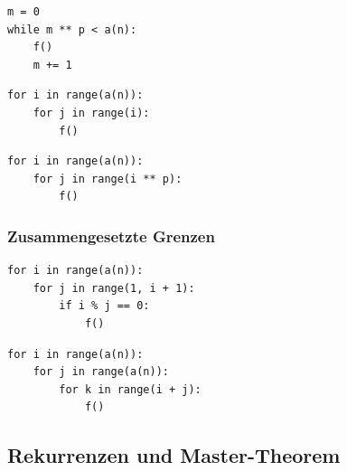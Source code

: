 \begin{loopcatalog}
\begin{lstlisting}[style=CodeExpert]
m = 0
while m ** p < a(n):
    f()
    m += 1
\end{lstlisting}

\begin{lstlisting}[style=CodeExpert]
for i in range(a(n)):
    for j in range(i):
        f()
\end{lstlisting}

\begin{lstlisting}[style=CodeExpert]
for i in range(a(n)):
    for j in range(i ** p):
        f()
\end{lstlisting}
\end{loopcatalog}

\subsubsection{Zusammengesetzte Grenzen}

\begin{loopcatalog}
\begin{lstlisting}[style=CodeExpert]
for i in range(a(n)):
    for j in range(1, i + 1):
        if i % j == 0:
            f()
\end{lstlisting}

\begin{lstlisting}[style=CodeExpert]
for i in range(a(n)):
    for j in range(a(n)):
        for k in range(i + j):
            f()
\end{lstlisting}
\end{loopcatalog}


\subsection{Rekurrenzen und Master-Theorem}\label{sec:05-rekurrenzen-und-master-theorem}

